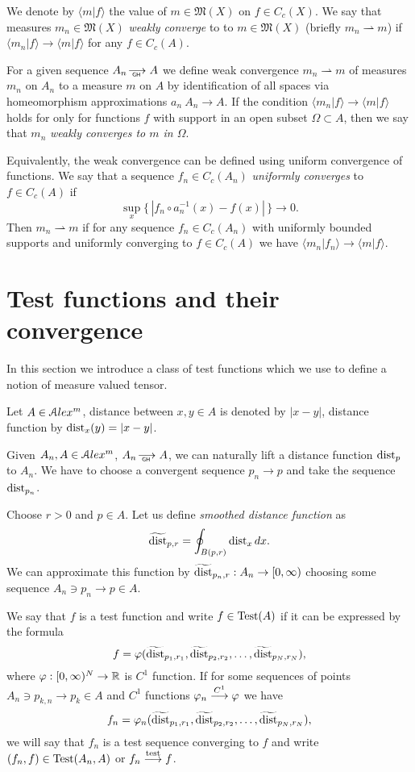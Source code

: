 We  denote by $\langle m|f\rangle $ the value of
$m\in\mathfrak M(X)$
 on $f\in C_c(X)$.
 We say that measures $m_n\in \mathfrak M(X)$ 
\emph{weakly converge} to
to $m\in \mathfrak M(X)$ (briefly
$m_n\rightharpoonup m$)
if $\langle m_n|f\rangle \to \langle m|f\rangle $ for
any
$f\in C_c(A)$.


For a given  sequence $A_n\GHto A$
we define weak convergence $m_n\rightharpoonup m$ of measures $m_n$ on $A_n$ to a measure $m$ on $A$
by identification of all spaces via homeomorphism
approximations $a_n\:A_n\to A$.
If the condition $\langle m_n|f\rangle \to \langle m|f\rangle $ holds for only for functions $f$ with support in an open subset $\Omega\subset A$, then we say that $m_n$ \emph{weakly converges to $m$ in $\Omega$}.

Equivalently, the weak convergence can be defined using uniform convergence of functions.
We say that  a sequence $f_n\in C_c(A_n)$
\emph{uniformly converges} to $f\in C_c(A)$
if 
\[\sup_x\{\,|f_n\circ a_n^{-1}(x)-f(x)|\,\}\to 0.\]
Then  $m_n\rightharpoonup m$
if for any sequence $f_n\in C_c(A_n)$
with uniformly bounded supports and
uniformly converging to $f\in C_c(A)$
we have $\langle m_n|f_n\rangle \to \langle m|f\rangle $.


\section{Test functions and their convergence}
In this section we introduce a class of test functions
which we use
to define  a notion of measure valued tensor.

Let $A\in \mathcal{A}lex^m$, distance between $x,y\in A$ is denoted by $|x-y|$,
distance function  by $\operatorname{dist}_x(y)=|x-y|$.



Given $A_n, A\in \mathcal{A}lex^m$,  $A_n\GHto A$,
we can naturally lift a distance function $\operatorname{dist}_p$ to $A_n$.
We have to choose a convergent sequence $p_n\to p$ and take the
sequence $\operatorname{dist}_{p_n}$.

Choose $r>0$ and $p\in A$.
Let us define \emph{smoothed distance function} as 
$$\widetilde{\operatorname{dist}}_{p,r} =\oint_{B(p,r)} \operatorname{dist}_{x}dx.$$ 
We can approximate this function by
$\widetilde{\operatorname{dist}}_{p_n,r}:A_n\to [0,\infty)  $
 choosing
  some  sequence $A_n\ni p_n\to p\in A$.

We say that $f$ is a test function
and write $f\in \operatorname{Test}(A)$ if it can be expressed by the formula
$$f=\varphi( \widetilde{\operatorname{dist}}_{p_1,r_1}, \widetilde{\operatorname{dist}}_{p_2,r_2},\dots,   \widetilde{\operatorname{dist}}_{p_N,r_N}),$$
where $\varphi:[0,\infty)^N\to\mathbb{R}$ is  $C^1$ function.
If for some sequences of points $A_n\ni p_{k,n}\to p_k\in A$
and $C^1$ functions   
$\varphi_n\stackrel{C^1}{\longrightarrow} \varphi$ we have
$$f_n=\varphi_n( \widetilde{\operatorname{dist}}_{p_1,r_1}, \widetilde{\operatorname{dist}}_{p_2,r_2},\dots,   \widetilde{\operatorname{dist}}_{p_N,r_N}),$$
we will say that $f_n$ is a test sequence converging to $f$ and write
$(f_n,f)\zz\in \Test(A_n,A)$ or $f_n\stackrel{\tiny\rm test}{\longrightarrow} f$.

